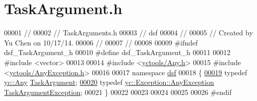 \hypertarget{_task_argument_8h_source}{}\section{Task\+Argument.\+h}
\label{_task_argument_8h_source}

\begin{DoxyCode}
00001 \textcolor{comment}{//}
00002 \textcolor{comment}{//  TaskArguments.h}
00003 \textcolor{comment}{//  dsf}
00004 \textcolor{comment}{//}
00005 \textcolor{comment}{//  Created by Yu Chen on 10/17/14.}
00006 \textcolor{comment}{//}
00007 \textcolor{comment}{//}
00008 
00009 \textcolor{preprocessor}{#ifndef dsf\_TaskArgument\_h}
00010 \textcolor{preprocessor}{#define dsf\_TaskArgument\_h}
00011 
00012 \textcolor{preprocessor}{#include <vector>}
00013 
00014 \textcolor{preprocessor}{#include <\hyperlink{_any_8h}{yctools/Any.h}>}
00015 \textcolor{preprocessor}{#include <\hyperlink{_any_exception_8h}{yctools/AnyException.h}>}
00016 
00017 \textcolor{keyword}{namespace }\hyperlink{namespacedsf}{dsf}
00018 \{
\hypertarget{_task_argument_8h_source_l00019}{}\hyperlink{namespacedsf_abe4bf68433935a81c31a5ada9b17663a}{00019}     \textcolor{keyword}{typedef} \hyperlink{classyc_1_1_any}{yc::Any} \hyperlink{namespacedsf_abe4bf68433935a81c31a5ada9b17663a}{TaskArgument};
\hypertarget{_task_argument_8h_source_l00020}{}\hyperlink{namespacedsf_af54027177bbfc0037be408a612d48b83}{00020}     \textcolor{keyword}{typedef} \hyperlink{classyc_1_1_exception_1_1_any_exception}{yc::Exception::AnyException} 
      \hyperlink{namespacedsf_af54027177bbfc0037be408a612d48b83}{TaskArgumentException};
00021 \}
00022 
00023 
00024 
00025 
00026 \textcolor{preprocessor}{#endif}
\end{DoxyCode}
